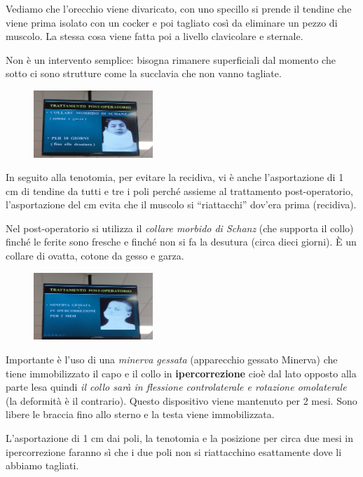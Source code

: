 Vediamo che l'orecchio viene divaricato, con uno specillo si prende il tendine che viene prima isolato con un cocker e poi tagliato così da eliminare un pezzo di muscolo. La stessa cosa viene fatta poi a livello clavicolare e sternale.

Non è un intervento semplice: bisogna rimanere superficiali dal momento che sotto ci sono strutture come la succlavia che non vanno tagliate.

\begin{figure}[!ht]
\centering
\includegraphics[width=0.4\textwidth]{013/image29.jpeg}
\end{figure}

In seguito alla tenotomia, per evitare la recidiva, vi è anche l'asportazione di 1 cm di tendine da tutti e tre i poli perché assieme al trattamento post-operatorio, l'asportazione del cm evita che il muscolo si ``riattacchi'' dov'era prima (recidiva).

Nel post-operatorio si utilizza il \emph{collare morbido di Schanz} (che supporta il collo) finché le ferite sono fresche e finché non si fa la desutura (circa dieci giorni). È un collare di ovatta, cotone da gesso e
garza.

\begin{figure}[!ht]
\centering
\includegraphics[width=0.4\textwidth]{013/image30.jpeg}
\end{figure}

Importante è l'uso di una \emph{minerva gessata} (apparecchio gessato Minerva) che tiene immobilizzato il capo e il collo in \textbf{ipercorrezione} cioè dal lato opposto alla parte lesa quindi \emph{il collo sarà in flessione controlaterale e rotazione omolaterale} (la deformità è il contrario). Questo dispositivo viene mantenuto per 2 mesi. Sono libere le braccia fino allo sterno e la testa viene immobilizzata.

L'asportazione di 1 cm dai poli, la tenotomia e la posizione per circa due mesi in ipercorrezione faranno sì che i due poli non si riattacchino esattamente dove li abbiamo tagliati.

